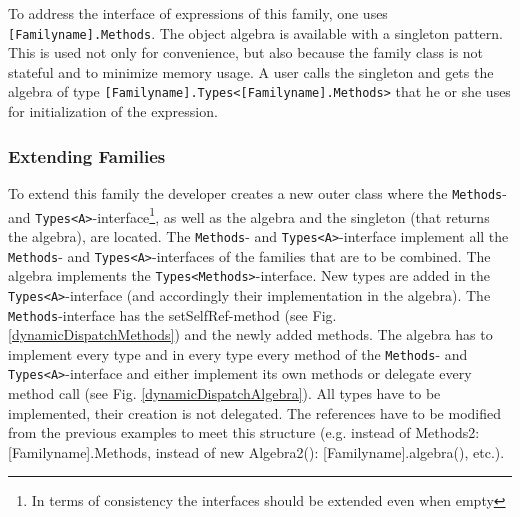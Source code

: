 \documentclass{report}
\begin{document}
To address the interface of expressions of this family, one uses \linebreak\lstinline{[Familyname].Methods}. The object algebra is available with a singleton pattern. This is used not only for convenience, but also because the family class is not stateful and to minimize memory usage. A user calls the singleton and gets the algebra of type \lstinline{[Familyname].Types<[Familyname].Methods>} that he or she uses for initialization of the expression.

\subsubsection*{Extending Families}
\label{extendingFamilies}

To extend this family the developer creates a new outer class where the \lstinline{Methods}- and \lstinline{Types<A>}-interface\footnote{In terms of consistency the interfaces should be extended even when empty}, as well as the algebra and the singleton (that returns the algebra), are located. The \lstinline{Methods}- and \lstinline{Types<A>}-interface implement all the \lstinline{Methods}- and \lstinline{Types<A>}-interfaces of the families that are to be combined. The algebra implements the \lstinline{Types<Methods>}-interface. New types are added in the \lstinline{Types<A>}-interface (and accordingly their implementation in the algebra). The \lstinline{Methods}-interface has the setSelfRef-method (see Fig. \ref{dynamicDispatchMethods}) and the newly added methods. The algebra has to implement every type and in every type every method of the \lstinline{Methods}- and \lstinline{Types<A>}-interface and either implement its own methods or delegate every method call (see Fig. \ref{dynamicDispatchAlgebra}). All types have to be implemented, their creation is not delegated. The references have to be modified from the previous examples to meet this structure (e.g. instead of Methods2: [Familyname].Methods, instead of new Algebra2(): [Familyname].algebra(), etc.).
\end{document}
